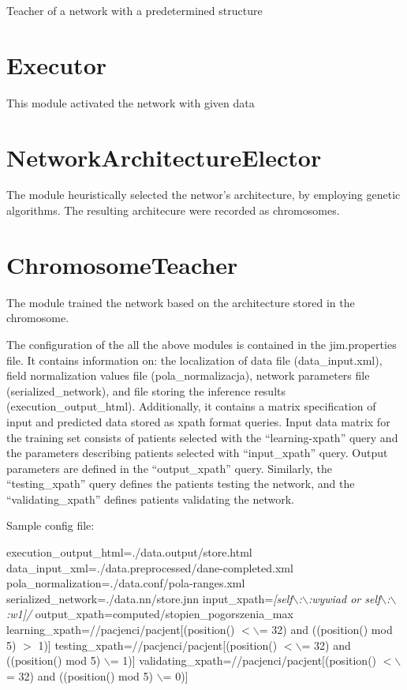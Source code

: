 \documentclass[10pt,oneside]{memoir}
\begin{document}
Teacher of a network with a predetermined structure


\section{Executor}
\label{executor}

This module activated the network with given data


\section{NetworkArchitectureElector}
\label{networkarchitectureelector}

The module heuristically selected the networ's architecture, by employing genetic algorithms. The resulting architecure were recorded as chromosomes.


\section{ChromosomeTeacher}
\label{chromosometeacher}

The module trained the network based on the architecture stored in the chromosome.


The configuration of the all the above modules is contained in the jim.properties file. It contains information on: the localization of data file (data\_input.xml), field normalization values file (pola\_normalizacja), network parameters file (serialized\_network), and file storing the inference results (execution\_output\_html). Additionally, it contains a matrix specification of input and predicted data stored as xpath format queries.  Input data matrix for the training set consists of patients selected with the ``learning-xpath'' query and  the parameters describing patients selected with ``input\_xpath'' query. Output parameters are defined in the ``output\_xpath'' query. Similarly, the ``testing\_xpath'' query defines the patients testing the network, and the ``validating\_xpath'' defines patients validating the network.


Sample config file:


execution\_output\_html=./data.output/store.html
data\_input\_xml=./data.preprocessed/dane-completed.xml
pola\_normalization=./data.conf/pola-ranges.xml
serialized\_network=./data.nn/store.jnn
input\_xpath={\itshape [self$\backslash$:$\backslash$:wywiad or self$\backslash$:$\backslash$:w1]/}
output\_xpath=computed/stopien\_pogorszenia\_max
learning\_xpath=//pacjenci/pacjent[(position() $<$$\backslash$= 32) and ((position() mod 5) $>$ 1)]
testing\_xpath=//pacjenci/pacjent[(position() $<$$\backslash$= 32) and ((position() mod 5) $\backslash$= 1)]
validating\_xpath=//pacjenci/pacjent[(position() $<$$\backslash$= 32) and ((position() mod 5) $\backslash$= 0)]
\end{document}
